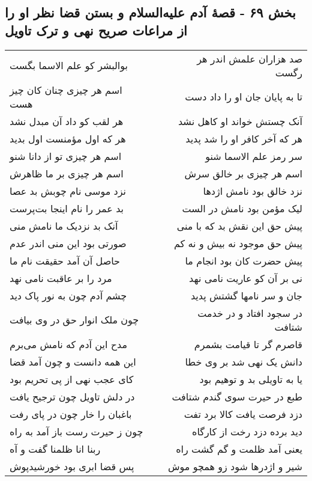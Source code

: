 \begin{center}
\section*{بخش ۶۹ - قصهٔ آدم علیه‌السلام و بستن قضا نظر او را از مراعات صریح نهی و ترک تاویل}
\label{sec:sh069}
\begin{longtable}{l p{0.5cm} r}
بوالبشر کو علم الاسما بگست
&&
صد هزاران علمش اندر هر رگست
\\
اسم هر چیزی چنان کان چیز هست
&&
تا به پایان جان او را داد دست
\\
هر لقب کو داد آن مبدل نشد
&&
آنک چستش خواند او کاهل نشد
\\
هر که اول مؤمنست اول بدید
&&
هر که آخر کافر او را شد پدید
\\
اسم هر چیزی تو از دانا شنو
&&
سر رمز علم الاسما شنو
\\
اسم هر چیزی بر ما ظاهرش
&&
اسم هر چیزی بر خالق سرش
\\
نزد موسی نام چوبش بد عصا
&&
نزد خالق بود نامش اژدها
\\
بد عمر را نام اینجا بت‌پرست
&&
لیک مؤمن بود نامش در الست
\\
آنک بد نزدیک ما نامش منی
&&
پیش حق این نقش بد که با منی
\\
صورتی بود این منی اندر عدم
&&
پیش حق موجود نه بیش و نه کم
\\
حاصل آن آمد حقیقت نام ما
&&
پیش حضرت کان بود انجام ما
\\
مرد را بر عاقبت نامی نهد
&&
نی بر آن کو عاریت نامی نهد
\\
چشم آدم چون به نور پاک دید
&&
جان و سر نامها گشتش پدید
\\
چون ملک انوار حق در وی بیافت
&&
در سجود افتاد و در خدمت شتافت
\\
مدح این آدم که نامش می‌برم
&&
قاصرم گر تا قیامت بشمرم
\\
این همه دانست و چون آمد قضا
&&
دانش یک نهی شد بر وی خطا
\\
کای عجب نهی از پی تحریم بود
&&
یا به تاویلی بد و توهیم بود
\\
در دلش تاویل چون ترجیح یافت
&&
طبع در حیرت سوی گندم شتافت
\\
باغبان را خار چون در پای رفت
&&
دزد فرصت یافت کالا برد تفت
\\
چون ز حیرت رست باز آمد به راه
&&
دید برده دزد رخت از کارگاه
\\
ربنا انا ظلمنا گفت و آه
&&
یعنی آمد ظلمت و گم گشت راه
\\
پس قضا ابری بود خورشیدپوش
&&
شیر و اژدرها شود زو همچو موش
\\

\end{longtable}
\end{center}
